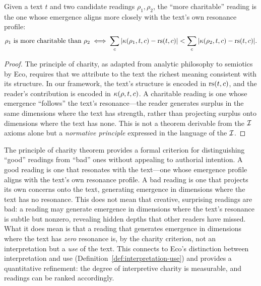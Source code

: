 \begin{theorem}
\label{thm:principle-charity}
Given a text $t$ and two candidate readings $\rho_1, \rho_2$, the ``more charitable'' reading is the one whose emergence aligns more closely with the text's own resonance profile:
\[
  \rho_1 \text{ is more charitable than } \rho_2 \iff \sum_{c} |\kappa(\rho_1, t, c) - \mathrm{rs}(t, c)| < \sum_{c} |\kappa(\rho_2, t, c) - \mathrm{rs}(t, c)|.
\]
\end{theorem}

\begin{proof}
The principle of charity, as adapted from analytic philosophy to semiotics by Eco, requires that we attribute to the text the richest meaning consistent with its structure. In our framework, the text's structure is encoded in $\mathrm{rs}(t, c)$, and the reader's contribution is encoded in $\kappa(\rho, t, c)$. A charitable reading is one whose emergence ``follows'' the text's resonance---the reader generates surplus in the same dimensions where the text has strength, rather than projecting surplus onto dimensions where the text has none. This is not a theorem derivable from the $\mathcal{I}$ axioms alone but a \emph{normative principle} expressed in the language of the $\mathcal{I}$.
\end{proof}

\begin{interpretation}
The principle of charity theorem provides a formal criterion for distinguishing ``good'' readings from ``bad'' ones without appealing to authorial intention. A good reading is one that resonates with the text---one whose emergence profile aligns with the text's own resonance profile. A bad reading is one that projects its own concerns onto the text, generating emergence in dimensions where the text has no resonance. This does not mean that creative, surprising readings are bad: a reading may generate emergence in dimensions where the text's resonance is subtle but nonzero, revealing hidden depths that other readers have missed. What it does mean is that a reading that generates emergence in dimensions where the text has \emph{zero} resonance is, by the charity criterion, not an interpretation but a \emph{use} of the text. This connects to Eco's distinction between interpretation and use (Definition~\ref{def:interpretation-use}) and provides a quantitative refinement: the degree of interpretive charity is measurable, and readings can be ranked accordingly.
\end{interpretation}

